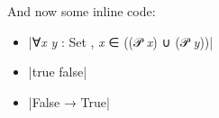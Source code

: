 \documentclass[oneside]{memoir}
\begin{document}
And now some inline code:


\begin{itemize}
\item \LeanVerb|∀\textit{x} \textit{y} : Set , \textit{x} ∈ ((𝒫 \textit{x}) ∪ (𝒫 \textit{y}))|

\item \LeanVerb|true  false|

\item \LeanVerb|False → True|


\end{itemize}




\mainmatter
\end{document}
